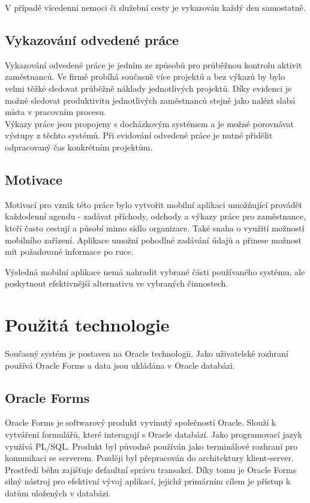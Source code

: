 \documentclass{diplomka}
\begin{document}
V případě vícedenní nemoci či služební cesty je vykazován každý den samostatně.

\subsection{Vykazování odvedené práce}
Vykazování odvedené práce je jedním ze způsobů pro průběžnou kontrolu aktivit zaměstnanců. Ve firmě probíhá současně více projektů a bez výkazů by bylo velmi těžké sledovat průběžně náklady jednotlivých projektů. 
Díky evidenci je možné sledovat produktivitu jednotlivých zaměstnanců stejně jako nalézt slabá místa v pracovním procesu.
\\ \indent Výkazy práce jsou propojeny s docházkovým systémem a je možné porovnávat výstupy z těchto systémů. Při evidování odvedené práce je nutné přidělit odpracovaný čas konkrétním projektům. 
\newpage
\subsection{Motivace}
Motivací pro vznik této práce bylo vytvořit mobilní aplikaci umožňující provádět každodenní agendu - zadávat příchody, odchody a výkazy práce pro zaměstnance, kteří často cestují a působí mimo sídlo organizace. Také snaha o využití možností mobilního zařízení. Aplikace umožní pohodlné zadávání údajů a přinese možnost mít požadované informace po ruce.

Výsledná mobilní aplikace nemá nahradit vybrané části používaného systému, ale poskytnout efektivnější alternativu ve vybraných činnostech.


\section{Použitá technologie}
Současný systém je postaven na Oracle technologii. Jako uživatelské rozhraní používá Oracle Forms a data jsou ukládána v Oracle databázi.
 
\subsection{Oracle Forms}
Oracle Forms\cite{forms} je softwarový produkt vyvinutý společností Oracle. Slouží k vytváření formulářů, které interagují s Oracle databází. Jako programovací jazyk využívá PL/SQL. Produkt byl původně používán jako terminálové rozhraní pro komunikaci se serverem. Později byl přepracován do architektury klient-server.\\ \indent
Prostředí běhu zajišťuje defaultní správu transakcí. Díky tomu je Oracle Forms silný nástroj pro efektivní vývoj aplikací, jejichž primárním cílem je přístup k datům uložených v databázi. 
\end{document}
